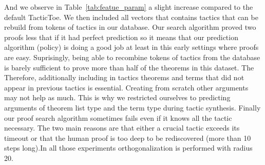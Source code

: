 \documentclass[runningheads,a4paper,draft]{svjour3}
\def\metis{\textsf{Metis}\xspace}
\def\tactictoe{\textsf{TacticToe}\xspace}
\newcommand{\ra}[1]{\renewcommand{\arraystretch}{#1}}
\begin{document}
And we observe in Table~\ref{tab:featue_param} a 
slight increase compared to the default \tactictoe. We then included all 
vectors that contains tactics that can be rebuild from tokens of
tactics in our database. 
Our search algorithm proved two proofs less that if it had perfect prediction 
so it means that our prediction algorithm (policy) is doing a good  job at 
least in this early settings where proofs are easy. 
Suprisingly, being able to recombine tokens of tactics from the database is 
barely sufficient to prove more than half of the theorems in this dataset. The 
Therefore, additionally including in tactics theorems and terms that did not 
appear in previous tactics is essential. Creating from scratch other arguments 
may not help as much. This is why we restricted ourselves to predicting 
arguments of theorem list type and the term type during tactic synthesis. 
Finally our proof search algorithm sometimes fails even if it knows all the 
tactic necessary. The two main reasons are that either a crucial tactic 
exceeds 
its timeout or that the human proof is too deep to be rediscovered (more than 
10 steps long).In all those experiments orthogonalization is performed with 
radius 20.
%
%
\end{document}
